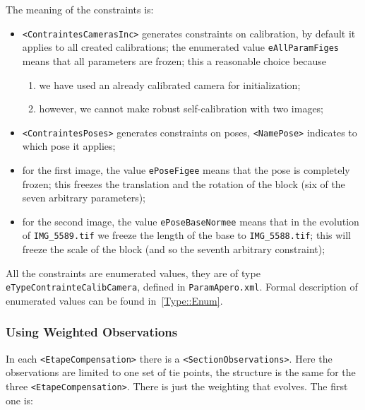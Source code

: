 The meaning of the constraints is:

\begin{itemize}
   \item {\tt <ContraintesCamerasInc>} generates constraints on calibration,
         by default it applies to all created calibrations;
         the enumerated value {\tt eAllParamFiges} means that all parameters are frozen;
         this a reasonable choice because %
\begin{enumerate}
    \item we have used an already calibrated camera for initialization;
    \item however, we cannot make robust self-calibration with two images;
\end{enumerate}

   \item {\tt <ContraintesPoses>} generates constraints on poses, {\tt <NamePose>}
         indicates to which pose it applies;

    \item for the first image, the value {\tt ePoseFigee} means that the pose
          is completely frozen; this freezes the translation and the rotation of the block (six of the
          seven arbitrary parameters);

    \item for the second image, the value {\tt ePoseBaseNormee} means that in
           the evolution of {\tt IMG\_5589.tif} we freeze the
          length of the base to  {\tt IMG\_5588.tif}; this will freeze the 
          scale of the block (and so the seventh arbitrary constraint);
\end{itemize}

All the constraints are enumerated values, they are of type 
{\tt eTypeContrainteCalibCamera}, defined in {\tt ParamApero.xml}.
Formal description of enumerated values can be found in~\ref{Type::Enum}.


\subsubsection{Using Weighted Observations}

In each {\tt <EtapeCompensation>} there is a {\tt <SectionObservations>}.
Here the observations are limited to one set of tie points, the structure
is the same for the three {\tt <EtapeCompensation>}. There is just
the weighting that evolves.  The first one is:

